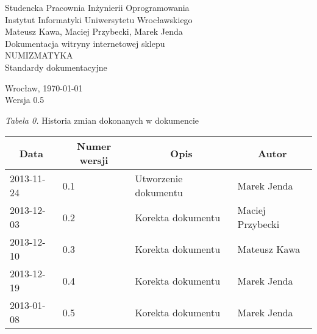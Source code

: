 \documentclass 	[11pt, a4paper, leqno]	{article}					%
\begin{document}

\begin{center}
	\thispagestyle{empty} %
	{\large Studencka Pracownia Inżynierii Oprogramowania} 		\\ [0.5cm]
	{\large Instytut Informatyki Uniwersytetu Wrocławskiego} 	\\ [6.0cm]

	{\large Mateusz Kawa, Maciej Przybecki, Marek Jenda} 		\\ [1.5cm]

	{\huge Dokumentacja witryny internetowej sklepu} 		\\ [0.5cm]
	{\huge NUMIZMATYKA} 						\\ [1.5cm]

	{\large Standardy dokumentacyjne} 				\\ [0.5cm]

	\vfill
	
	{\large Wrocław, \today}					\\ [0.5cm]
	{\large Wersja 0.5}
\end{center}

\newpage


\textit{Tabela 0.} Historia zmian dokonanych w dokumencie

\begin{center}
	\begin{tabular}{| l | l | l | l |}
		\hline
		\multicolumn{1}{|c|}{Data} & 
		\multicolumn{1}{|c|}{Numer wersji} &  
		\multicolumn{1}{|c|}{Opis} &
		\multicolumn{1}{|c|}{Autor} 				 \\ \hline \hline
		2013-11-24 & 0.1 & Utworzenie dokumentu & Marek Jenda	 \\ \hline
		2013-12-03 & 0.2 & Korekta dokumentu & Maciej Przybecki	 \\ \hline
		2013-12-10 & 0.3 & Korekta dokumentu & Mateusz Kawa	 \\ \hline
		2013-12-19 & 0.4 & Korekta dokumentu & Marek Jenda	 \\ \hline
		2013-01-08 & 0.5 & Korekta dokumentu & Marek Jenda	 \\ \hline
	\end{tabular}
\end{center} 

\medskip %

\end{document}
